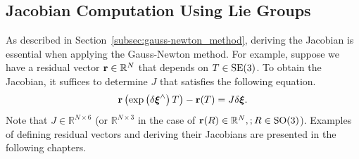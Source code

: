 \subsection{Jacobian Computation Using Lie Groups}

As described in Section~\ref{subsec:gauss-newton_method}, deriving the Jacobian is essential when applying the Gauss-Newton method.
For example, suppose we have a residual vector ${\bf r} \in \mathbb{R}^{N}$ that depends on $T \in {\rm SE}(3)$.
To obtain the Jacobian, it suffices to determine $J$ that satisfies the following equation.
%
\begin{align}
  {\bf r} \left( \exp \left( \delta \boldsymbol \xi^{\wedge} \right) T \right) - {\bf r}(T)
= J \delta \boldsymbol \xi.
\end{align}
%
Note that $J \in \mathbb{R}^{N \times 6}$ (or $\mathbb{R}^{N \times 3}$ in the case of ${\bf r}(R) \in \mathbb{R}^{N}, ; R \in {\rm SO}(3)$).
Examples of defining residual vectors and deriving their Jacobians are presented in the following chapters.


